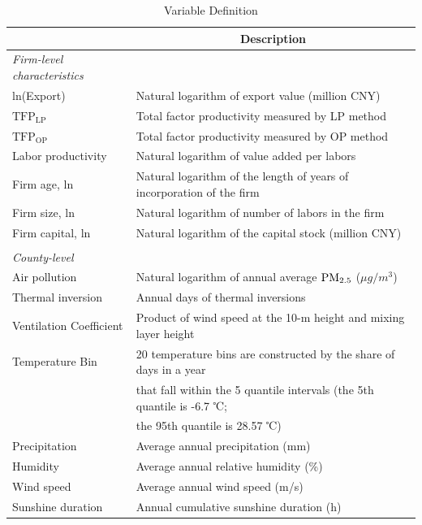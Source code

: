 \documentclass[12pt]{article}
\begin{document}
\newpage
\begin{table}[H]\centering
  \caption{Variable Definition}\label{tab:var_definition}
  \footnotesize
  \begin{tabular}{l*{1}{l}}
    \hline\hline
    &\multicolumn{1}{c}{Description}\\    
    \hline
    \textit{Firm-level characteristics} \\
    ln(Export)	& Natural logarithm of export value (million CNY) \\
    $\mathrm{TFP_{LP}}$	&Total factor productivity measured by LP method \\
    $\mathrm{TFP_{OP}}$	&Total factor productivity measured by OP method \\
    Labor productivity & Natural logarithm of value added per labors \\
    Firm age, ln 	& Natural logarithm of the length of years of incorporation of the firm\\
    Firm size, ln	& Natural logarithm of number of labors in the firm \\
    Firm capital, ln	& Natural logarithm of the capital stock (million CNY) \\
                       &\\
    \textit{County-level} &\\    
    Air pollution       &Natural logarithm of annual average $\rm PM_{2.5}$ ($\mu g/m^3$) \\
    Thermal inversion	&Annual days of thermal inversions\\
    Ventilation Coefficient & Product of wind speed at the 10-m height and mixing layer height\\
    Temperature Bin     &20 temperature bins are constructed by the share of days in a year \\
                        &that fall within the 5 quantile intervals (the 5th quantile is -6.7 ℃;\\
                        &the 95th quantile is 28.57 ℃)\\
    Precipitation       &Average annual precipitation (mm)\\
    Humidity            &Average annual relative humidity (\%)\\
    Wind speed          &Average annual wind speed (m/s)\\
    Sunshine duration   &Annual cumulative sunshine duration (h)\\
    \hline\hline
  \end{tabular}
\end{table}
\end{document}
